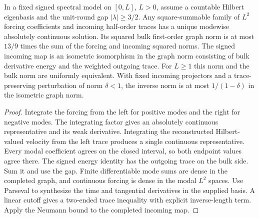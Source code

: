 \begin{proposition}
\label{prop:weak-spectral-incoming}
\leanok
In a fixed signed spectral model on $[0,L]$, $L>0$, assume a
countable Hilbert eigenbasis and the unit-round gap $|\lambda|\ge3/2$.
Any square-summable family of $L^2$ forcing coefficients and incoming
half-order traces has a unique modewise absolutely continuous solution.
Its squared bulk first-order graph norm is at most $13/9$ times the
sum of the forcing and incoming squared norms. The signed incoming
map is an isometric isomorphism in the graph norm consisting of bulk
derivative energy and the weighted outgoing trace. For $L\ge1$
this norm and the bulk norm are uniformly equivalent.
With fixed incoming projectors and a trace-preserving perturbation
of norm $\delta<1$, the inverse norm is at most $1/(1-\delta)$
in the isometric graph norm.
\end{proposition}
\begin{proof}
\leanok
Integrate the forcing from the left for positive modes and the right
for negative modes. The integrating factor gives an absolutely
continuous representative and its weak derivative. Integrating the reconstructed Hilbert-valued velocity from the left trace produces a single continuous representative. Every modal coefficient agrees on the closed interval, so both endpoint values agree there. The signed energy
identity has the outgoing trace on the bulk side. Sum it and use
the gap. Finite differentiable mode sums are dense in the completed
graph, and continuous forcing is dense in the modal $L^2$ spaces.
Use Parseval to synthesize the time and tangential derivatives in the
supplied basis. A linear cutoff gives a two-ended trace inequality
with explicit inverse-length term. Apply the Neumann bound to the
completed incoming map.
\end{proof}
